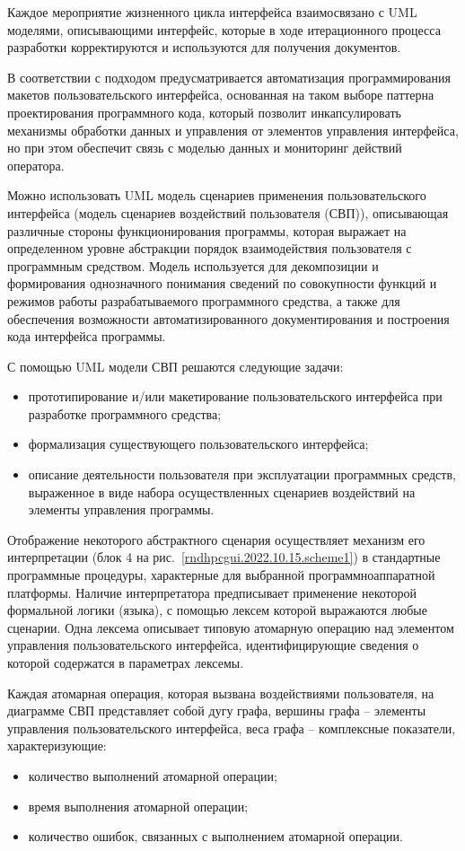 	
Каждое мероприятие жизненного цикла интерфейса взаимосвязано с UML моделями, описывающими интерфейс, которые в ходе итерационного процесса разработки корректируются и используются для получения документов.
	
В соответствии с подходом предусматривается автоматизация программирования макетов пользовательского интерфейса, основанная на таком выборе паттерна проектирования программного кода, который позволит инкапсулировать механизмы обработки данных и управления от элементов управления интерфейса, но при этом обеспечит связь с моделью данных и мониторинг действий оператора.
	
Можно использовать UML модель сценариев применения пользовательского интерфейса (модель сценариев воздействий пользователя (СВП)), описывающая различные стороны функционирования программы, которая выражает на определенном уровне абстракции порядок взаимодействия пользователя с программным средством. Модель используется для декомпозиции и формирования однозначного понимания сведений по совокупности функций и режимов работы разрабатываемого программного средства, а также для обеспечения возможности автоматизированного документирования и построения кода интерфейса программы.

С помощью UML модели СВП решаются следующие задачи: 
\begin{itemize}
	\item прототипирование и/или макетирование пользовательского интерфейса при разработке программного средства;
	\item формализация существующего пользовательского интерфейса;
	\item описание деятельности пользователя при эксплуатации программных средств, выраженное в виде набора осуществленных сценариев воздействий на элементы управления программы.
\end{itemize}

Отображение некоторого абстрактного сценария осуществляет механизм его интерпретации (блок 4 на рис.~\ref{rndhpcgui.2022.10.15.scheme1}) в стандартные программные процедуры, характерные для выбранной программноаппаратной платформы. Наличие интерпретатора предписывает применение некоторой формальной логики (языка), с помощью лексем которой выражаются любые сценарии. Одна лексема описывает типовую атомарную операцию над элементом управления пользовательского интерфейса, идентифицирующие сведения о которой содержатся в параметрах лексемы.
	
Каждая атомарная операция, которая вызвана воздействиями пользователя, на диаграмме СВП представляет собой дугу графа, вершины графа -- элементы управления пользовательского интерфейса, веса графа -- комплексные показатели, характеризующие:
\begin{itemize}
	\item количество выполнений атомарной операции; 
	\item время выполнения атомарной операции;
	\item количество ошибок, связанных с выполнением атомарной операции.
\end{itemize}
\noteattributes{}

